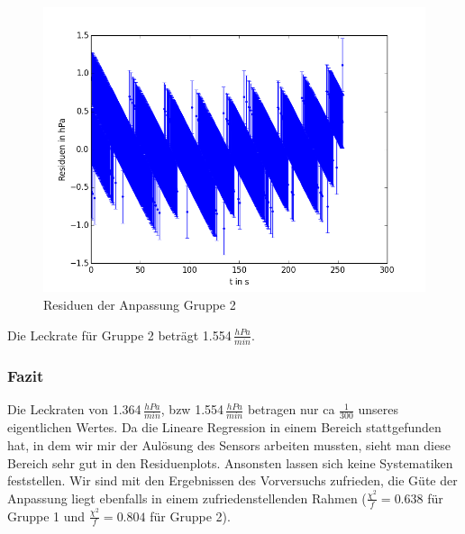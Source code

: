 \documentclass[12pt,a4paper]{article}
\begin{document}
\begin{figure}[H]
\centering
\includegraphics[scale=0.5]{Bilder/residuen_dichtigkeit_EL.png}
\caption{Residuen der Anpassung Gruppe 2}
\end{figure}

Die Leckrate für Gruppe 2 beträgt 1.554$\,\frac{hPa}{min}$.

\subsubsection{Fazit}
Die Leckraten von 1.364$\,\frac{hPa}{min}$, bzw 1.554$\,\frac{hPa}{min}$ betragen nur ca $\frac{1}{300}$ unseres eigentlichen Wertes. Da die Lineare Regression in einem Bereich stattgefunden hat, in dem wir mir der Aulösung des Sensors arbeiten mussten, sieht man diese Bereich sehr gut in den Residuenplots. Ansonsten lassen sich keine Systematiken feststellen. Wir sind mit den Ergebnissen des Vorversuchs zufrieden, die Güte der Anpassung liegt ebenfalls in einem zufriedenstellenden Rahmen ($\frac{\chi^2}{f}=0.638$ für Gruppe 1 und $\frac{\chi^2}{f}=0.804$ für Gruppe 2).
\end{document}
